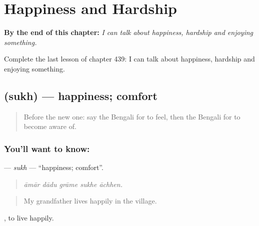 
\chapter{Happiness and Hardship}
\label{ch:bn-happiness-and-hardship}

\begin{chapteropening}
\textbf{By the end of this chapter:} \emph{I can talk about happiness, hardship and enjoying something.}

Complete the last lesson of chapter 439: I can talk about happiness, hardship and enjoying something.
\end{chapteropening}

\section[\texorpdfstring{\bn{সুখ} (sukh)}{সুখ (sukh)}]{ (sukh) — happiness; comfort}

\label{lesson:BN-C439-sukh}



\begin{quote}
Before the new one: say the Bengali for to feel, then the Bengali for to become aware of.
\end{quote}

\subsection*{You'll want to know: }
\textbf{} — \emph{sukh} — \textquotedblleft{}happiness; comfort\textquotedblright{}.

\begin{quote}
    
\end{quote}

\begin{quote}
\emph{āmār dādu grāme sukhe āchhen.}
\end{quote}

\begin{quote}
My grandfather lives happily in the village.
\end{quote}

 , to live happily.

